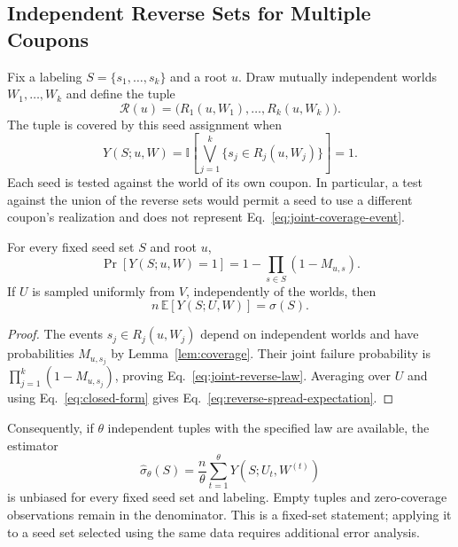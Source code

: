 \documentclass[sigconf]{acmart}
\newcommand{\E}{\mathbb{E}}
\newcommand{\I}{\mathbb{I}}
\begin{document}
\subsection{Independent Reverse Sets for Multiple Coupons}
\label{sec:joint-reverse}

Fix a labeling $S=\{s_1,\ldots,s_k\}$ and a root $u$. Draw mutually
independent worlds $W_1,\ldots,W_k$ and define the tuple
\[
  \mathcal R(u)=\bigl(R_1(u,W_1),\ldots,R_k(u,W_k)\bigr).
\]
The tuple is covered by this seed assignment when
\begin{equation}
\label{eq:joint-coverage-event}
  Y(S;u,W)=
  \I\!\left[\bigvee_{j=1}^{k}\{s_j\in R_j(u,W_j)\}\right]=1.
\end{equation}
Each seed is tested against the world of its own coupon. In
particular, a test against the union of the reverse sets would
permit a seed to use a different coupon's realization and does not
represent Eq.~\eqref{eq:joint-coverage-event}.

\begin{lemma}
\label{lem:unbiased}
For every fixed seed set $S$ and root $u$,
\begin{equation}
\label{eq:joint-reverse-law}
  \Pr[Y(S;u,W)=1]=1-\prod_{s\in S}(1-M_{u,s}).
\end{equation}
If $U$ is sampled uniformly from $V$, independently of the worlds,
then
\begin{equation}
\label{eq:reverse-spread-expectation}
  n\,\E[Y(S;U,W)]=\sigma(S).
\end{equation}
\end{lemma}

\begin{proof}
The events $s_j\in R_j(u,W_j)$ depend on independent worlds and have
probabilities $M_{u,s_j}$ by Lemma~\ref{lem:coverage}. Their joint
failure probability is $\prod_{j=1}^{k}(1-M_{u,s_j})$, proving
Eq.~\eqref{eq:joint-reverse-law}. Averaging over $U$ and using
Eq.~\eqref{eq:closed-form} gives
Eq.~\eqref{eq:reverse-spread-expectation}.
\end{proof}

Consequently, if $\theta$ independent tuples with the specified law
are available, the estimator
\[
  \hat\sigma_\theta(S)=\frac n\theta
    \sum_{t=1}^{\theta}Y(S;U_t,W^{(t)})
\]
is unbiased for every fixed seed set and labeling. Empty tuples and
zero-coverage observations remain in the denominator. This is a
fixed-set statement; applying it to a seed set selected using the
same data requires additional error analysis.
\end{document}
